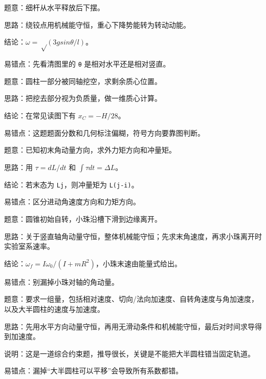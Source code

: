 \documentclass[12pt,a4paper]{ctexart}
\begin{document}
\begin{tcolorbox}[colback=white,colframe=black!55,title={21. 水平释放的匀质细杆下摆到某角度时的角速度}]
题意：细杆从水平释放后下摆。\par
思路：绕铰点用机械能守恒，重心下降势能转为转动动能。\par
结论：\(ω=√(3g sinθ/l)\)。\par
易错点：先看清图里的 \texttt{θ} 是相对水平还是相对竖直。\par
\end{tcolorbox}

\begin{tcolorbox}[colback=white,colframe=black!55,title={22. 同轴挖孔后的圆柱体质心坐标}]
题意：圆柱一部分被同轴挖空，求剩余质心位置。\par
思路：把挖去部分视为负质量，做一维质心计算。\par
结论：在常见读图下有 \(x_C=-H/28\)。\par
易错点：这题题面分数和几何标注偏糊，符号方向要靠图判断。\par
\end{tcolorbox}

\begin{tcolorbox}[colback=white,colframe=black!55,title={23. 水平自转轴回转仪的进动与冲量矩}]
题意：已知初末角动量方向，求外力矩方向和冲量矩。\par
思路：用 \(τ=dL/dt\) 和 \(∫τdt=ΔL\)。\par
结论：若末态为 \texttt{Lj}，则冲量矩为 \texttt{L(j-i)}。\par
易错点：区分进动角速度方向和力矩方向。\par
\end{tcolorbox}

\begin{tcolorbox}[colback=white,colframe=black!55,title={24. 转动圆锥上有一条母线槽，小珠由顶端滑到槽底}]
题意：圆锥初始自转，小珠沿槽下滑到边缘离开。\par
思路：关于竖直轴角动量守恒，整体机械能守恒；先求末角速度，再求小珠离开时实验室系速率。\par
结论：\(ω_f=Iω_0/(I+mR^2)\)，小珠末速由能量式给出。\par
易错点：别漏掉小珠对轴的角动量。\par
\end{tcolorbox}

\begin{tcolorbox}[colback=white,colframe=black!55,title={25. 小圆柱在可平移半圆柱外侧纯滚下落}]
题意：要求一组量，包括相对速度、切向/法向加速度、自转角速度与角加速度，以及大半圆柱的速度与加速度。\par
思路：先用水平方向动量守恒，再用无滑动条件和机械能守恒，最后对时间求导得到加速度。\par
说明：这是一道综合约束题，推导很长，关键是不能把大半圆柱错当固定轨道。\par
易错点：漏掉“大半圆柱可以平移”会导致所有系数都错。\par
\end{tcolorbox}
\end{document}
